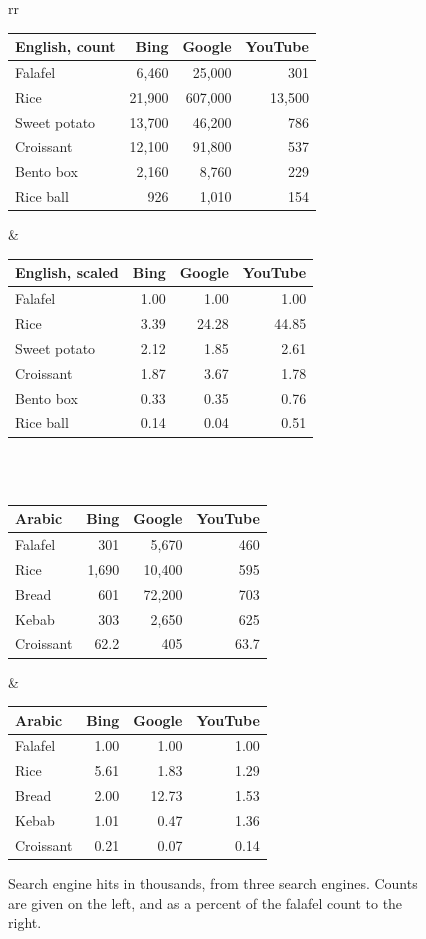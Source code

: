 \documentclass[a4paper,10pt]{article}
\begin{document}
\begin{figure}
\hspace{-2cm}
\begin{tabular}{rr}

\begin{tabular}{l|rrr}
{\bf English, count} & Bing & Google & YouTube \\\hline
Falafel  & 6,460 & 25,000 & 301\\
Rice    & 21,900 & 607,000 & 13,500\\
Sweet potato & 13,700 & 46,200 & 786\\
Croissant & 12,100 & 91,800 & 537 \\
Bento box & 2,160 & 8,760 & 229 \\
Rice ball & 926 & 1,010 & 154\\
\end{tabular}

&

\begin{tabular}{l|rrr}
{\bf English, scaled} & Bing & Google & YouTube \\\hline

Falafel  &1.00& 1.00 & 1.00 \\
Rice    &3.39&24.28 & 44.85 \\
Sweet potato &2.12& 1.85 & 2.61 \\
Croissant &1.87& 3.67 & 1.78 \\
Bento box &0.33& 0.35 & 0.76 \\
Rice ball &0.14& 0.04 & 0.51
\end{tabular}
\\
\phantom{Filler}\\

\begin{tabular}{l|rrr}
{\bf Arabic} & Bing & Google & YouTube \\\hline
Falafel & 301  & 5,670 & 460\\
Rice & 1,690& 10,400 & 595\\
Bread  & 601& 72,200   & 703\\
Kebab & 303 & 2,650   & 625\\
Croissant & 62.2 & 405 & 63.7
\end{tabular}

&
\begin{tabular}{l|rrr}
{\bf Arabic} & Bing & Google & YouTube \\\hline
Falafel & 1.00 & 1.00  & 	1.00\\
Rice & 5.61 & 1.83	 &  1.29\\
Bread & 2.00 & 12.73 &    1.53\\
Kebab & 1.01 & 0.47	 &  1.36\\
Croissant & 0.21 & 0.07	 &  0.14
\end{tabular}

\end{tabular}
\caption{Search engine hits in thousands, from three search engines. Counts are given on
the left, and as a percent of the falafel count to the right.}
\label{counttab}

\end{figure}
\end{document}
